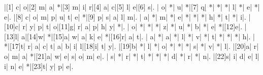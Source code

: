 \documentclass[twocolumn]{article}
\begin{document}
\pagestyle{empty}\raggedright
\begin{Puzzle}{13}{13}
  |[1] c|    o|[2] m|    a|    *|[3] m|    i|    r|[4] a|    c|[5] l|    e|[6] s|.
  |    o|    *|    u|    *|[7] q|    *|    *|    *|    l|    *|    e|    *|    e|.
  |[8] c|    o|    m|    p|    u|    t|    e|    *|[9] p|    s|    a|    l|    m|.
  |    a|    *|    m|    *|    e|    *|    *|    *|    h|    *|    t|    *|    i|.
  |[10]c|    r|    y|    p|    t|    o|[11]g|    r|    a|    p|    h|    y|    *|.
  |    o|    *|    *|    *|    z|    *|    u|    *|    b|    *|    e|    *|[12]e|.
  |[13]l|    a|[14]w|    *|[15]a|    w|    a|    k|    e|    *|[16]r|    a|    t|.
  |    a|    *|    a|    *|    l|    *|    v|    *|    t|    *|    *|    *|    h|.
  |    *|[17]t|    r|    a|    c|    t|    a|    b|    i|    l|[18]i|    t|    y|.
  |[19]b|    *|    l|    *|    o|    *|    *|    *|    s|    *|    v|    *|    l|.
  |[20]a|    r|    o|    m|    a|    *|[21]a|    w|    e|    s|    o|    m|    e|.
  |    s|    *|    r|    *|    t|    *|    *|    *|    d|    *|    r|    *|    n|.
  |[22]s|    i|    d|    e|    l|    i|    n|    e|    *|[23]t|    y|    p|    e|.
\end{Puzzle}
\end{document}
